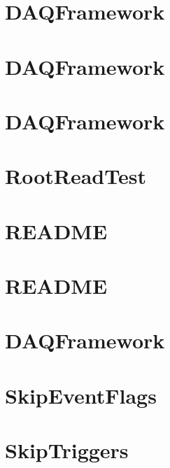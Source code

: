 \let\mypdfximage\pdfximage\def\pdfximage{\immediate\mypdfximage}\documentclass[twoside]{book}
\newcommand{\+}{\discretionary{\mbox{\scriptsize$\hookleftarrow$}}{}{}}
\begin{document}
\chapter{DAQFramework}
\label{md_UserTools_ReadMCParticles_README}

\chapter{DAQFramework}
\label{md_UserTools_README}

\chapter{DAQFramework}
\label{md_UserTools_RelicMuonPlots_README}

\chapter{Root\+Read\+Test}
\label{md_UserTools_RootReadTest_README}

\chapter{README}
\label{md_UserTools_RunwiseEnergyCut_README}

\chapter{README}
\label{md_UserTools_SimplifyTree_README}

\chapter{DAQFramework}
\label{md_UserTools_SK2p2MeV_README}

\chapter{Skip\+Event\+Flags}
\label{md_UserTools_SkipEventFlags_README}

\chapter{Skip\+Triggers}
\label{md_UserTools_SkipTriggers_README}

\end{document}
